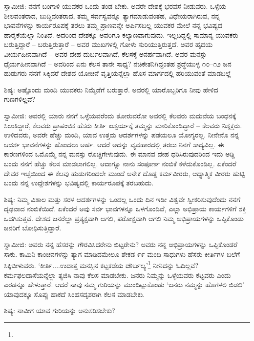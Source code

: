 ಸ್ವಾಮೀಜಿ: ನನಗೆ ಬಂಗಾಳಿ ಯುವಕರ ಒಂದು ತಂಡ ಬೇಕು. ಅವರೇ ದೇಶಕ್ಕೆ ಭರವಸೆ ನೀಡುವರು. ಒಳ್ಳೆಯ ಶೀಲವಂತರಾದ, ಬುದ್ಧಿವಂತರಾದ, ತಮ್ಮ ಸರ್ವಸ್ವವನ್ನೂ ತ್ಯಾಗಮಾಡುವಂತಹ, ವಿಧೇಯರಾಗಿರುವ, ನನ್ನ ಭಾವನೆಗಳನ್ನು ಕಾರ್ಯರೂಪಕ್ಕೆ ತರಲು ತಮ್ಮ ಪ್ರಾಣವನ್ನೇ ಅರ್ಪಿಸಬಲ್ಲ ಯುವಕರ ಮೇಲೆ ನನ್ನ ಭವಿಷ್ಯದ ಹಾರೈಕೆಯೆಲ್ಲಾ ನಿಂತಿದೆ. ಅದರಿಂದ ದೇಶಕ್ಕೂ ಅವರಿಗೂ ಕಲ್ಯಾಣವಾಗುವುದು. ಇಲ್ಲದಿದ್ದಲ್ಲಿ ಸಾಮಾನ್ಯ ಯುವಕರು ಬರುತ್ತಿದ್ದಾರೆ – ಬರುತ್ತಿರುತ್ತಾರೆ – ಅವರ ಮುಖಗಳಲ್ಲಿ ಗೋಳು ಸುರಿಯುತ್ತಿರುತ್ತದೆ. ಅವರ ಹೃದಯ ವೀರ್ಯಹೀನವಾಗಿದೆ – ಅವರ ದೇಹ ದುರ್ಬಲವಾಗಿದೆ, ಕೆಲಸಕ್ಕೆ ಅನರ್ಹವಾಗಿದೆ. ಅವರ ಮನಸ್ಸು ಧೈರ್ಯಹೀನವಾಗಿದೆ – ಅವರಿಂದ ಏನು ಕೆಲಸ ತಾನೇ ಸಾಧ್ಯ? ನಚಿಕೇತನಿಗಿದ್ದಂತಹ ಶ್ರದ್ಧೆಯುಳ್ಳ ೧೦–೧೨ ಜನ ಹುಡುಗರು ನನಗೆ ಸಿಕ್ಕಿದರೆ ದೇಶದ ಯೋಚನೆ ವೃತ್ತಿಯನ್ನೆಲ್ಲಾ ಹೊಸ ಮಾರ್ಗದಲ್ಲಿ ಹರಿಯುವಂತೆ ಮಾಡಬಲ್ಲೆ

ಶಿಷ್ಯ: ಅಷ್ಟೊಂದು ಮಂದಿ ಯುವಕರು ನಿಮ್ಮೆಡೆಗೆ ಬರುತ್ತಾರೆ. ಅವರಲ್ಲಿ ಯಾರೊಬ್ಬರಿಗೂ ನೀವು ಹೇಳಿದ ಗುಣಗಳಿಲ್ಲವೆ?

ಸ್ವಾಮೀಜಿ: ಅವರಲ್ಲಿ ಯಾರು ನನಗೆ ಒಳ್ಳೆಯವರೆಂದು ತೋರುವರೋ ಅವರಲ್ಲಿ ಕೆಲವರು ಮದುವೆಯ ಬಂಧನಕ್ಕೆ ಸಿಲುಕಿದ್ದಾರೆ, ಕೆಲವರು ಪ್ರಾಪಂಚಿಕ ಹೆಸರು ಕೀರ್ತಿ ಐಶ್ವರ್ಯಕ್ಕೆ ತಮ್ಮನ್ನು ಮಾರಿಕೊಂಡಿದ್ದಾರೆ – ಕೆಲವರು ನಿಶ್ಶಕ್ತರು. ಉಳಿದವರು, ಅವರೇ ಹೆಚ್ಚು ಮಂದಿ, ಯಾವ ಉತ್ತಮ ಆದರ್ಶಗಳನ್ನು ಪಡೆಯಲೂ ಯೋಗ್ಯರಲ್ಲ. ನೀನೇನೊ ನನ್ನ ಆದರ್ಶ ಭಾವನೆಗಳನ್ನು ಹೊಂದಲು ಅರ್ಹ. ಆದರೆ ಅದನ್ನು ವ್ಯವಹಾರದಲ್ಲಿ ತರಲು ನಿನಗೆ ಸಾಧ್ಯವಿಲ್ಲ. ಈ ಕಾರಣಗಳಿಂದ ಒಮೊಮ್ಮೆ ನನ್ನ ಮನಸ್ಸು ರೊಚ್ಚಿಗೇಳುವುದು. ಈ ಮಾನವ ದೇಹ ಧರಿಸಿರುವುದರಿಂದ ಇದು ಅಡ್ಡಿ ಬಂದು ನನಗೆ ಹೆಚ್ಚು ಕೆಲಸ ಮಾಡಲಾಗಲಿಲ್ಲ. ಆದಾಗ್ಯೂ ನಾನು ಸಂಪೂರ್ಣ ನಂಬಿಕೆ ಕಳೆದುಕೊಂಡಿಲ್ಲ. ಏಕೆಂದರೆ ದೇವರ ಇಚ್ಛೆಯಿಂದ ಈ ಕೆಲವು ಹುಡುಗರಿಂದಲೇ ಮುಂದೆ ಅನೇಕ ದೊಡ್ಡ ಕರ್ಮವೀರರು, ಆಧ್ಯಾತ್ಮಿಕ ವೀರರು ಹುಟ್ಟಿ ಬಂದು ನನ್ನ ಉದ್ದೇಶಗಳನ್ನು ಭವಿಷ್ಯದಲ್ಲಿ ಕಾರ್ಯರೂಪಕ್ಕೆ ತರಬಹುದು.

ಶಿಷ್ಯ: ನಿಮ್ಮ ವಿಶಾಲ ಮತ್ತು ಸರಳ ಆದರ್ಶಗಳನ್ನು ಒಂದಲ್ಲ ಒಂದು ದಿನ ಇಡೀ ವಿಶ್ವವೇ ಸ್ವೀಕರಿಸುವುದೆಂದು ನನಗೆ ದೃಢವಾದ ನಂಬಿಕೆಯಿದೆ. ಏಕೆಂದರೆ ಅವು ಸರ್ವ ಭಾವಗಳನ್ನೂ ಒಳಗೊಂಡಿವೆ, ಎಲ್ಲಾ ಅಭಿಪ್ರಾಯ ಕಾರ್ಯಗಳಿಗೆ ಶಕ್ತಿ ಒದಗಿಸುತ್ತವೆ. ದೇಶದ ಜನರೆಲ್ಲಾ ಪ್ರತ್ಯಕ್ಷವಾಗಿ ಆಗಲಿ, ಪರೋಕ್ಷವಾಗಿ ಆಗಲಿ ನಿಮ್ಮ ಅಭಿಪ್ರಾಯಗಳನ್ನು ಒಪ್ಪಿಕೊಂಡು ಜನರಿಗೆ ಬೋಧಿಸುತ್ತಿದ್ದಾರೆ.

ಸ್ವಾಮೀಜಿ: ಅವರು ನನ್ನ ಹೆಸರನ್ನು ಗೌರವಿಸಿದರೇನು ಬಿಟ್ಟರೇನು? ಅವರು ನನ್ನ ಅಭಿಪ್ರಾಯಗಳನ್ನು ಒಪ್ಪಿಕೊಂಡರೆ ಸಾಕು. ಕಾಮಿನಿ ಕಾಂಚನಗಳನ್ನು ತ್ಯಾಗ ಮಾಡಿದಮೇಲೂ ಶೇಕಡ ೯೯ ಮಂದಿ ಸಾಧುಗಳು ಹೆಸರು ಕೀರ್ತಿಗಳ ಬಲೆಗೆ ಸಿಕ್ಕಿಬೀಳುವರು. ‘ಕೀರ್ತಿ....ಉದಾತ್ತ ಮನಸ್ಸಿನ ಕಟ್ಟಕಡೆಯ ದೌರ್ಬಲ್ಯ’\footnote{} ನೀನಿದನ್ನು ಓದಿಲ್ಲವೆ? ಕರ್ಮಫಲದಾಸೆಯನ್ನೆಲ್ಲಾ ತ್ಯಜಿಸಿ ನಾವು ಕೆಲಸ ಮಾಡಬೇಕು. ಜನರು ನಿಮ್ಮನ್ನು ಒಳ್ಳೆಯವರು ಕೆಟ್ಟವರು ಎಂದು ಎರಡನ್ನೂ ಹೇಳುತ್ತಾರೆ. ಆದರೆ ನಾವು ನಮ್ಮ ಗುರಿಯನ್ನು ಮುಂದಿಟ್ಟುಕೊಂಡು ‘ಜನರು ನಮ್ಮನ್ನು ಹೊಗಳಲಿ ಬಿಡಲಿ’ ಯಾವುದಕ್ಕೂ ಸೊಪ್ಪು ಹಾಕದೆ ಸಿಂಹಸದೃಶರಾಗಿ ಕೆಲಸ ಮಾಡಬೇಕು.

ಶಿಷ್ಯ: ನಾವೀಗ ಯಾವ ಗುರಿಯನ್ನು ಅನುಸರಿಸಬೇಕು?

